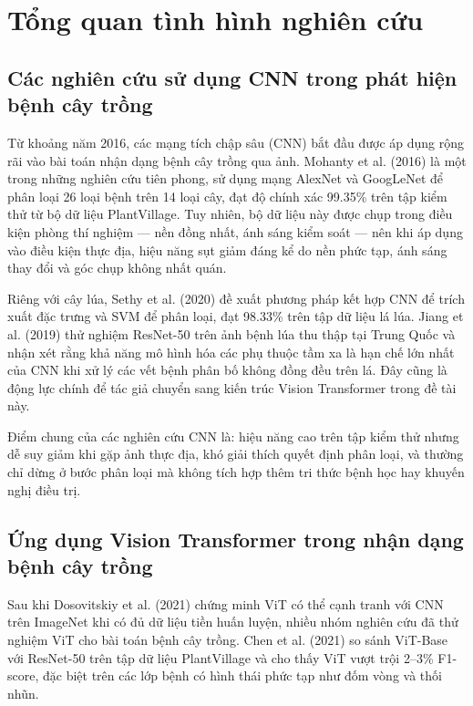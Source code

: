 \documentclass[13pt,a4paper]{extreport}
\begin{document}
\section{Tổng quan tình hình nghiên cứu}

\subsection{Các nghiên cứu sử dụng CNN trong phát hiện bệnh cây trồng}

Từ khoảng năm 2016, các mạng tích chập sâu (CNN) bắt đầu được áp dụng rộng rãi vào bài toán nhận dạng bệnh cây trồng qua ảnh. Mohanty et al. (2016) \cite{mohanty2016} là một trong những nghiên cứu tiên phong, sử dụng mạng AlexNet và GoogLeNet để phân loại 26 loại bệnh trên 14 loại cây, đạt độ chính xác 99.35\% trên tập kiểm thử từ bộ dữ liệu PlantVillage. Tuy nhiên, bộ dữ liệu này được chụp trong điều kiện phòng thí nghiệm --- nền đồng nhất, ánh sáng kiểm soát --- nên khi áp dụng vào điều kiện thực địa, hiệu năng sụt giảm đáng kể do nền phức tạp, ánh sáng thay đổi và góc chụp không nhất quán.

Riêng với cây lúa, Sethy et al. (2020) \cite{sethy2020} đề xuất phương pháp kết hợp CNN để trích xuất đặc trưng và SVM để phân loại, đạt 98.33\% trên tập dữ liệu lá lúa. Jiang et al. (2019) \cite{jiang2019} thử nghiệm ResNet-50 trên ảnh bệnh lúa thu thập tại Trung Quốc và nhận xét rằng khả năng mô hình hóa các phụ thuộc tầm xa là hạn chế lớn nhất của CNN khi xử lý các vết bệnh phân bố không đồng đều trên lá. Đây cũng là động lực chính để tác giả chuyển sang kiến trúc Vision Transformer trong đề tài này.

Điểm chung của các nghiên cứu CNN là: hiệu năng cao trên tập kiểm thử nhưng dễ suy giảm khi gặp ảnh thực địa, khó giải thích quyết định phân loại, và thường chỉ dừng ở bước phân loại mà không tích hợp thêm tri thức bệnh học hay khuyến nghị điều trị.

\subsection{Ứng dụng Vision Transformer trong nhận dạng bệnh cây trồng}

Sau khi Dosovitskiy et al. (2021) \cite{dosovitskiy2020} chứng minh ViT có thể cạnh tranh với CNN trên ImageNet khi có đủ dữ liệu tiền huấn luyện, nhiều nhóm nghiên cứu đã thử nghiệm ViT cho bài toán bệnh cây trồng. Chen et al. (2021) \cite{chen2021} so sánh ViT-Base với ResNet-50 trên tập dữ liệu PlantVillage và cho thấy ViT vượt trội 2--3\% F1-score, đặc biệt trên các lớp bệnh có hình thái phức tạp như đốm vòng và thối nhũn.
\end{document}
